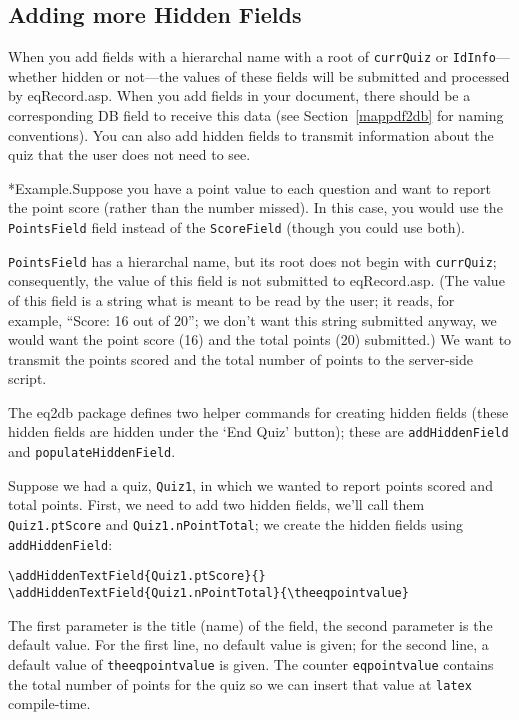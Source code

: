 \documentclass{article}
\makeatletter
\let\bslash=\@backslashchar
\renewcommand{\paragraph}
    {\@startsection{paragraph}{4}{0pt}{6pt}{-3pt}
    {\normalfont\normalsize\bfseries}}
\def\cs#1{\texttt{\bslash#1}}
\let\pkg\textsf
\newcounter{exampleno}
\newcommand\Example{\refstepcounter{exampleno}%
\paragraph*{Example.}}
\makeatother
\begin{document}
\subsection{Adding more Hidden Fields}\label{moreHiddenFields}

When you add fields with a hierarchal name with a root of
\cs{currQuiz} or \texttt{IdInfo}---whether hidden or
not---the values of these fields will be submitted and processed
by \textsf{eqRecord.asp}. When you add fields in your document,
there should be a corresponding DB field to receive this data
(see Section~\ref{mappdf2db} for naming conventions). You can also
add hidden fields to transmit information about the quiz that the
user does not need to see.

\Example Suppose you have a point value to each question and want to report
the point score (rather than the number missed).  In this case, you would use
the \cs{PointsField} field instead of the \cs{ScoreField} (though you could
use both).

\cs{PointsField} has a hierarchal name, but its root
does not begin with \cs{currQuiz}; consequently, the value
of this field is not submitted to \textsf{eqRecord.asp}. (The
value of this field is a string what is meant to be read by the
user; it reads, for example, ``Score: 16 out of 20''; we don't
want this string submitted anyway, we would want the point score
(16) and the total points (20) submitted.) We want to transmit the
points scored and the total number of points to the server-side
script.

The \pkg{eq2db} package defines two helper commands for
creating hidden fields (these hidden fields are hidden under the
`End Quiz' button); these are \cs{addHiddenField} and
\cs{populate\-HiddenField}.

Suppose we had a quiz, \texttt{Quiz1}, in which we wanted to
report points scored and total points.  First, we need to add two
hidden fields, we'll call them \texttt{Quiz1.ptScore} and
\texttt{Quiz1.nPointTotal}; we create the hidden fields using
\cs{addHiddenField}:
\begin{Verbatim}[xleftmargin=\leftmargini,fontsize=\small]
\addHiddenTextField{Quiz1.ptScore}{}
\addHiddenTextField{Quiz1.nPointTotal}{\theeqpointvalue}
\end{Verbatim}
\noindent The first parameter is the title (name) of the field,
the second parameter is the default value.  For the first line, no
default value is given; for the second line, a default value of
\cs{theeqpointvalue} is given.  The counter \cs{eqpointvalue}
contains the total number of points for the quiz so we can insert
that value at \texttt{latex} compile-time.
\end{document}
